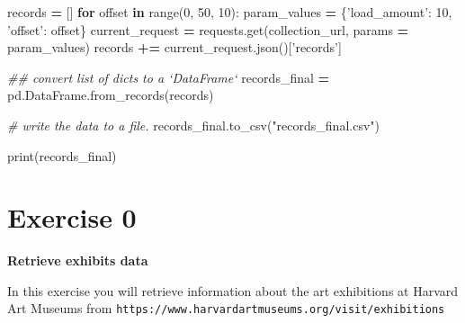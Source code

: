 \documentclass[]{book}
\newenvironment{Shaded}{\begin{snugshade}}{\end{snugshade}}
\newcommand{\BuiltInTok}[1]{#1}
\newcommand{\CommentTok}[1]{\textcolor[rgb]{0.56,0.35,0.01}{\textit{#1}}}
\newcommand{\ControlFlowTok}[1]{\textcolor[rgb]{0.13,0.29,0.53}{\textbf{#1}}}
\newcommand{\DecValTok}[1]{\textcolor[rgb]{0.00,0.00,0.81}{#1}}
\newcommand{\KeywordTok}[1]{\textcolor[rgb]{0.13,0.29,0.53}{\textbf{#1}}}
\newcommand{\NormalTok}[1]{#1}
\newcommand{\OperatorTok}[1]{\textcolor[rgb]{0.81,0.36,0.00}{\textbf{#1}}}
\newcommand{\StringTok}[1]{\textcolor[rgb]{0.31,0.60,0.02}{#1}}
\begin{document}
\begin{Shaded}
\begin{Highlighting}[]
\NormalTok{records }\OperatorTok{=}\NormalTok{ []}
\ControlFlowTok{for}\NormalTok{ offset }\KeywordTok{in} \BuiltInTok{range}\NormalTok{(}\DecValTok{0}\NormalTok{, }\DecValTok{50}\NormalTok{, }\DecValTok{10}\NormalTok{):}
\NormalTok{    param_values }\OperatorTok{=}\NormalTok{ \{}\StringTok{'load_amount'}\NormalTok{: }\DecValTok{10}\NormalTok{, }\StringTok{'offset'}\NormalTok{: offset\}}
\NormalTok{    current_request }\OperatorTok{=}\NormalTok{ requests.get(collection_url, params }\OperatorTok{=}\NormalTok{ param_values)}
\NormalTok{    records }\OperatorTok{+=}\NormalTok{ current_request.json()[}\StringTok{'records'}\NormalTok{]}
\end{Highlighting}
\end{Shaded}

\begin{Shaded}
\begin{Highlighting}[]
\CommentTok{## convert list of dicts to a `DataFrame`}
\NormalTok{records_final }\OperatorTok{=}\NormalTok{ pd.DataFrame.from_records(records)}
\end{Highlighting}
\end{Shaded}

\begin{Shaded}
\begin{Highlighting}[]
\CommentTok{# write the data to a file.}
\NormalTok{records_final.to_csv(}\StringTok{"records_final.csv"}\NormalTok{)}
\end{Highlighting}
\end{Shaded}

\begin{Shaded}
\begin{Highlighting}[]
\BuiltInTok{print}\NormalTok{(records_final)}
\end{Highlighting}
\end{Shaded}

\hypertarget{exercise-0-4}{%
\section{Exercise 0}\label{exercise-0-4}}

\textbf{Retrieve exhibits data}

In this exercise you will retrieve information about the art
exhibitions at Harvard Art Museums from
\texttt{https://www.harvardartmuseums.org/visit/exhibitions}
\end{document}
